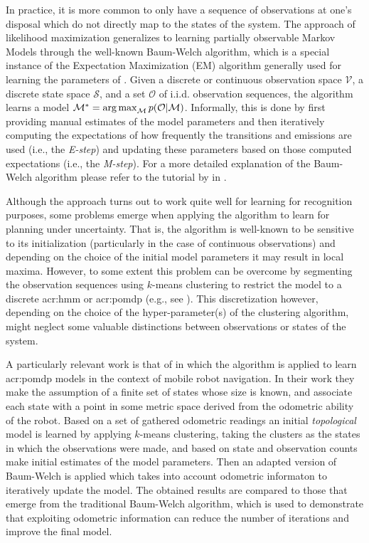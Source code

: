 In practice, it is more common to only have a sequence of observations at one's disposal which do not directly map to the states of the system.
The approach of likelihood maximization generalizes to learning partially observable Markov Models through the well-known Baum-Welch algorithm, which is a special instance of the Expectation Maximization (EM) algorithm generally used for learning the parameters of .
Given a discrete or continuous observation space $\mathcal{V}$, a discrete state space $\mathcal{S}$, and a set $\mathcal{O}$ of i.i.d. observation sequences, the algorithm learns a model $\mathcal{M}^\ast = \operatorname*{arg\,max}_\mathcal{M} p(\mathcal{O}\vert\mathcal{M})$.
Informally, this is done by first providing manual estimates of the model parameters and then iteratively computing the expectations of how frequently the transitions and emissions are used (i.e., the \textit{E-step}) and updating these parameters based on those computed expectations (i.e., the \textit{M-step}).
For a more detailed explanation of the Baum-Welch algorithm please refer to the tutorial by \citeauthor{bilmes1998gentle} in \cite{bilmes1998gentle}.

Although the approach turns out to work quite well for learning  for recognition purposes, some problems emerge when applying the algorithm to learn  for planning under uncertainty.
That is, the algorithm is well-known to be sensitive to its initialization (particularly in the case of continuous observations) and depending on the choice of the initial model parameters it may result in local maxima.
However, to some extent this problem can be overcome by segmenting the observation sequences using $k$-means clustering to restrict the model to a discrete \acrshort{acr:hmm} or \acrshort{acr:pomdp} (e.g., see \cite{calinon2007learning}).
This discretization however, depending on the choice of the hyper-parameter(s) of the clustering algorithm, might neglect some valuable distinctions between observations or states of the system.

A particularly relevant work is that of \citeauthor{shatkay1997learning} \cite{shatkay1997learning} in which the algorithm is applied to learn \acrshort{acr:pomdp} models in the context of mobile robot navigation.
In their work they make the assumption of a finite set of states whose size is known, and associate each state with a point in some metric space derived from the odometric ability of the robot.
Based on a set of gathered odometric readings an initial \textit{topological} model is learned by applying $k$-means clustering, taking the clusters as the states in which the observations were made, and based on state and observation counts make initial estimates of the model parameters.
Then an adapted version of Baum-Welch is applied which takes into account odometric informaton to iteratively update the model.
The obtained results are compared to those that emerge from the traditional Baum-Welch algorithm, which is used to demonstrate that exploiting odometric information can reduce the number of iterations and improve the final model.

